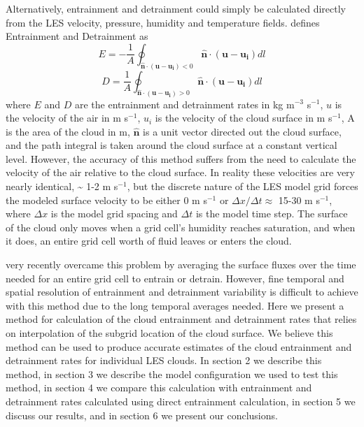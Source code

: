 \documentclass[12pt]{article}
\begin{document}
Alternatively, entrainment and detrainment could simply be calculated directly 
from the LES velocity, pressure, humidity and temperature fields.  
\cite{Siebesma1998} defines Entrainment and Detrainment as
\begin{equation}
E = -\frac{1}{A}\oint_{\mathbf{\hat{n}}\cdot(\mathbf{u} - \mathbf{u_i}) < 0}
\mathbf{\hat{n}}\cdot(\mathbf{u}-\mathbf{u_i})dl
\end{equation}
\begin{equation}
D = \frac{1}{A}\oint_{\mathbf{\hat{n}}\cdot(\mathbf{u} - \mathbf{u_i}) > 0}
\mathbf{\hat{n}}\cdot(\mathbf{u}-\mathbf{u_i})dl
\end{equation}
where $E$ and $D$ are the entrainment and detrainment rates in kg m$^{-3}$ 
s$^{-1}$, $u$ is the velocity of the air in m s$^{-1}$, $u_i$ is the velocity 
of the cloud surface in m s$^{-1}$, A is the area of the cloud in m,
$\mathbf{\hat{n}}$ is a unit vector directed out the cloud surface, and the 
path integral is taken around the cloud surface at a constant vertical level.
However, the accuracy of this method suffers from the need to calculate the 
velocity of the air relative to the cloud surface.  In reality these velocities 
are very nearly identical, \textasciitilde{} 1-2 m s$^{-1}$, but the discrete 
nature of the LES model grid forces the modeled surface velocity to be either 
0 m s$^{-1}$ or $\Delta x / \Delta t \approx$ 15-30 m s$^{-1}$, where 
$\Delta x$ is the model grid spacing and $\Delta t$ is the model time step.  The
surface of the cloud only moves when a grid cell's humidity reaches saturation, 
and when it does, an entire grid cell worth of fluid leaves or enters the cloud.

\cite{Romps2010} very recently overcame this problem by averaging the surface 
fluxes over the time needed for an entire grid cell to entrain or detrain.
However, fine temporal and spatial resolution of entrainment and detrainment 
variability is difficult to achieve with this method due to the long temporal 
averages needed.  Here we present a method for calculation of the cloud 
entrainment and detrainment rates that relies on interpolation of the subgrid 
location of the cloud surface.  We believe this method can be used to produce 
accurate estimates of the cloud entrainment and detrainment rates for 
individual LES clouds.  In section 2 we describe this method, in section 3 we 
describe the model configuration we used to test this method, in section 4 we 
compare this calculation with entrainment and detrainment rates calculated 
using \cite{Romps2010} direct entrainment calculation, in section 5 we 
discuss our results, and in section 6 we present our conclusions.  
\end{document}
